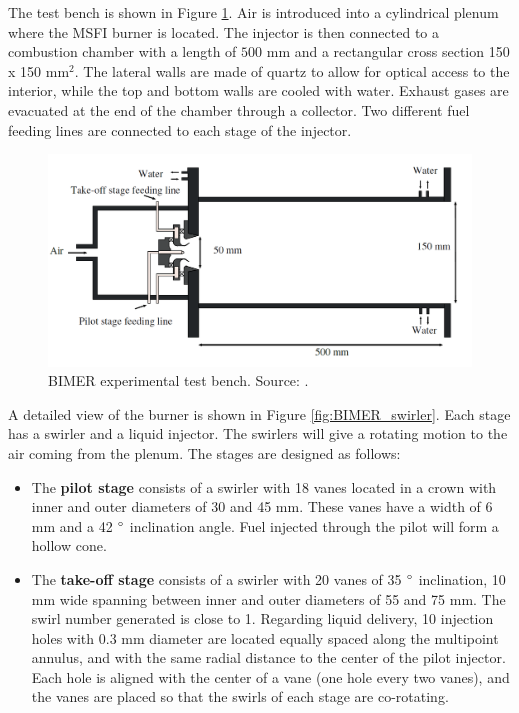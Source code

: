The test bench is shown in Figure \ref{fig:BIMER_test_bench_expe_maquette}. Air is introduced into a cylindrical plenum where the MSFI burner is located. The injector is then connected to a combustion chamber with a length of $500$ mm and a rectangular cross section 150 x 150 mm$^2$. The lateral walls are made of quartz to allow for optical access to the interior, while the top and bottom walls are cooled with water. Exhaust gases are evacuated at the end of the chamber through a collector. Two different fuel feeding lines are connected to each stage of the injector. 

\begin{figure}[h!]
	\centering
	\includegraphics[scale=0.5]{./part3_applications/figures_ch7_aero/BIMER_test_bench_expe_maquette}
	\caption[BIMER experimental test bench]{BIMER experimental test bench. Source: .}
	\label{fig:BIMER_test_bench_expe_maquette}
\end{figure}

A detailed view of the burner is shown in Figure \ref{fig:BIMER_swirler}. Each stage has a swirler and a liquid injector. The swirlers will give a rotating motion to the air coming from the plenum. The stages are designed as follows:

\begin{itemize}

	\item The \textbf{pilot stage} consists of a swirler with 18 vanes located in a crown with inner and outer diameters of 30 and 45 mm. These vanes have a width of 6 mm and a 42 $\degree$ inclination angle. Fuel injected through the pilot will form a hollow cone.
	
	\item The \textbf{take-off stage} consists of a swirler with 20 vanes of 35 $\degree$ inclination, 10 mm wide spanning between inner and outer diameters of 55 and 75 mm. The swirl number generated is close to 1. Regarding liquid delivery, 10 injection holes with $0.3$ mm diameter are located equally spaced along the multipoint annulus, and with the same radial distance to the center of the pilot injector. Each hole is aligned with the center of a vane (one hole every two vanes), and the vanes are placed so that the swirls of each stage are co-rotating.

\end{itemize}

